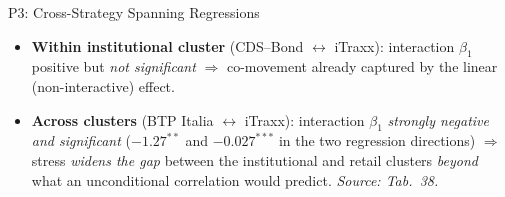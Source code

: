 \documentclass[aspectratio=169,11pt]{beamer}
\newcommand{\hlt}[1]{\textcolor{edhecred}{\textbf{#1}}}     %
\begin{document}
\begin{frame}[t]{P3: Cross-Strategy Spanning Regressions}
\vspace{0.30cm}

\begin{itemize}\itemsep=0.04cm\footnotesize
  \item \hlt{Within institutional cluster} (CDS--Bond $\leftrightarrow$ iTraxx): interaction $\beta_1$ positive but \emph{not significant} $\Rightarrow$ co-movement already captured by the linear (non-interactive) effect.
  \item \hlt{Across clusters} (BTP Italia $\leftrightarrow$ iTraxx): interaction $\beta_1$ \emph{strongly negative and significant} (\hlt{$-1.27^{**}$} and $-0.027^{***}$ in the two regression directions) $\Rightarrow$ stress \emph{widens the gap} between the institutional and retail clusters \emph{beyond} what an unconditional correlation would predict. \emph{Source: Tab.\ 38.}
\end{itemize}

\end{frame}
\end{document}
